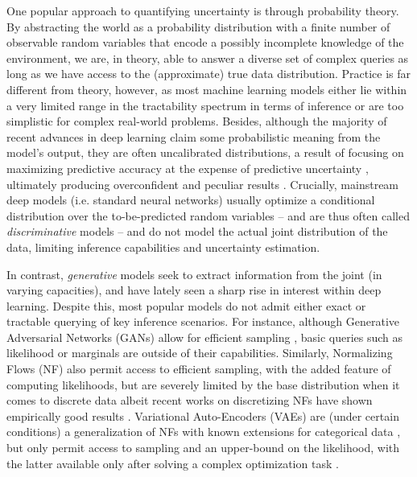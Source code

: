 One popular approach to quantifying uncertainty is through probability theory. By abstracting the
world as a probability distribution with a finite number of observable random variables that encode
a possibly incomplete knowledge of the environment, we are, in theory, able to answer a diverse set
of complex queries as long as we have access to the (approximate) true data distribution. Practice
is far different from theory, however, as most machine learning models either lie within a very
limited range in the tractability spectrum in terms of inference \citep{pctutorial} or are too
simplistic for complex real-world problems. Besides, although the majority of recent advances in
deep learning claim some probabilistic meaning from the model's output, they are often uncalibrated
distributions, a result of focusing on maximizing predictive accuracy at the expense of predictive
uncertainty \citep{guo17,yaniv19,chernikova19}, ultimately producing overconfident and peculiar
results \citep{szegedy13,wei18,su19,chernikova19}. Crucially, mainstream deep models (i.e. standard
neural networks) usually optimize a conditional distribution over the to-be-predicted random
variables -- and are thus often called \emph{discriminative} models -- and do not model the actual
joint distribution of the data, limiting inference capabilities and uncertainty estimation.

In contrast, \emph{generative} models seek to extract information from the joint (in varying
capacities), and have lately seen a sharp rise in interest within deep learning. Despite this, most
popular models do not admit either exact or tractable querying of key inference scenarios. For
instance, although Generative Adversarial Networks (GANs) allow for efficient sampling
\citep{goodfellow14}, basic queries such as likelihood or marginals are outside of their
capabilities.  Similarly, Normalizing Flows (NF) also permit access to efficient sampling, with the
added feature of computing likelihoods, but are severely limited by the base distribution when it
comes to discrete data \citep{rezende15,papamakarios21} albeit recent works on discretizing NFs
have shown empirically good results \citep{lippe21,ziegler19}. Variational Auto-Encoders (VAEs) are
(under certain conditions) a generalization of NFs \citep{yu20,gritsenko19} with known extensions
for categorical data \citep{rolfe17,vahdat18a,vahdat18b}, but only permit access to sampling and an
upper-bound on the likelihood, with the latter available only after solving a complex optimization
task \citep{kingma14}.

